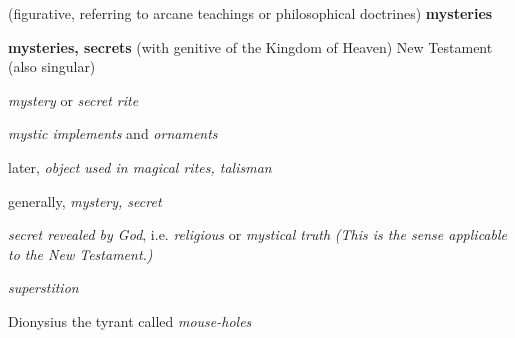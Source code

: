 \begin{compactdesc}
\begin{compactitem}
							\item[3] (figurative, referring to arcane teachings or philosophical doctrines) \textbf{mysteries}
							\item[4] \textbf{mysteries, secrets} (with genitive of the Kingdom of Heaven) New Testament (also singular)
						\end{compactitem}
					\item[LSJ 1156b, PDF 1227] \textbf{}
						\begin{compactitem}
							\item[I.1] \textit{mystery} or \textit{secret rite}
							\item[I.2a] \textit{mystic implements} and \textit{ornaments}
							\item[I.2b] later, \textit{object used in magical rites, talisman}
							\item[I.3] generally, \textit{mystery, secret}
							\item[I.4] \textit{secret revealed by God}, i.e. \textit{religious} or \textit{mystical truth} \textit{(This is the sense applicable to the New Testament.)}
							\item[I.5] \textit{superstition}
							\item[II] Dionysius the tyrant called \textit{mouse-holes} 
						\end{compactitem}
				\end{compactdesc}
				
				\begin{compactdesc}
					\item[Some NT uses] \textbf{}
						\begin{compactdesc}
							\item[Matthew 13:11]
							\item[Mark 4:11] 
							\item[Luke 8:10]
							\item[Romans 11:25]
							\item[Romans 16:25] 
							\item[1 Corinthians 4:1]
							\item[1 Corinthians 15:51]
							\item[Ephesians 3:3]
							\item[Ephesians 3:4]
							\item[Ephesians 3:9]
							\item[2 Thessalonians 2:7] 
							\item[1 Timothy 3:16] 
							\item[Revelation 17:7]
						\end{compactdesc}
				\end{compactdesc}
		
